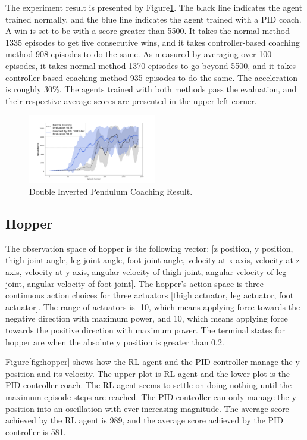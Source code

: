 \documentclass[journal]{IEEEtran}
\begin{document}
The experiment result is presented by Figure\ref{fig:double_result}. The black line indicates the agent trained normally, and the blue line indicates the agent trained with a PID coach. A win is set to be with a score greater than 5500. It takes the normal method 1335 episodes to get five consecutive wins, and it takes controller-based coaching method 908 episodes to do the same. As measured by averaging over 100 episodes, it takes normal method 1370 episodes to go beyond 5500, and it takes controller-based coaching method 935 episodes to do the same. The acceleration is roughly 30\%. The agents trained with both methods pass the evaluation, and their respective average scores are presented in the upper left corner.

\begin{figure}
     \centering
      \includegraphics[width=0.5\textwidth]{double.png}
      \caption{Double Inverted Pendulum Coaching Result.}
      \label{fig:double_result}
\end{figure}



\subsection{Hopper}
The observation space of hopper is the following vector: [z position, y position, thigh joint angle, leg joint angle, foot joint angle, velocity at x-axis, velocity at z-axis, velocity at y-axis, angular velocity of thigh joint, angular velocity of leg joint, angular velocity of foot joint]. The hopper's action space is three continuous action choices for three actuators [thigh actuator, leg actuator, foot actuator]. The range of actuators is -10, which means applying force towards the negative direction with maximum power, and 10, which means applying force towards the positive direction with maximum power. The terminal states for hopper are when the absolute y position is greater than 0.2.

Figure\ref{fig:hopper} shows how the RL agent and the PID controller manage the y position and its velocity. The upper plot is RL agent and the lower plot is the PID controller coach. The RL agent seems to settle on doing nothing until the maximum episode steps are reached. The PID controller can only manage the y position into an oscillation with ever-increasing magnitude. The average score achieved by the RL agent is 989, and the average score achieved by the PID controller is 581.
\end{document}
